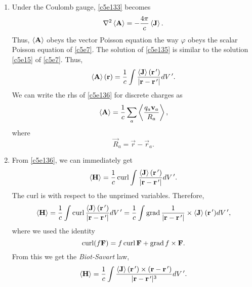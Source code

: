 \begin{enumerate}
\item Under the Coulomb gauge, \eqref{c5e133} becomes
\begin{equation}\label{c5e135}
\nabla^2\left\langle{\mathbf{A}}\right\rangle = -\frac{4\pi}{c}\left\langle{\mathbf{J}}\right\rangle.
\end{equation}
Thus, $\left\langle{\mathbf{A}}\right\rangle$ obeys the vector Poisson equation the way $\varphi$ obeys the
scalar Poisson equation of \eqref{c5e7}. The solution of \eqref{c5e135} is similar
to the solution \eqref{c5e15} of \eqref{c5e7}. Thus,
\begin{equation}\label{c5e136}
\left\langle{\mathbf{A}}\right\rangle(\mathbf{r}) = \frac{1}{c}\int\frac{\left\langle{\mathbf{J}}\right\rangle(\mathbf{r}^{\,\prime})}{|\mathbf{r} - \mathbf{r}^{\,\prime}|}dV^{\,\prime}.
\end{equation}
We can write the rhs of \eqref{c5e136} for discrete charges as
\begin{equation}\label{c5e137}
\left\langle{\mathbf{A}}\right\rangle = \frac{1}{c}\sum_a \left\langle{\frac{q_a\mathbf{v}_a}{R_a}}\right\rangle,
\end{equation}
where 
\begin{equation}\label{c5e138}
\vec{R}_a = \vec{r} - \vec{r}_a.
\end{equation}

\item From \eqref{c5e136}, we can immediately get
\[
\left\langle{\mathbf{H}}\right\rangle = \frac{1}{c}\operatorname{curl}\int\frac{\left\langle{\mathbf{J}}\right\rangle(\mathbf{r}^{\,\prime})}{|\mathbf{r} - \mathbf{r}^{\,\prime}|}dV^{\,\prime}.
\]
The curl is with respect to the unprimed variables. Therefore,
\[
\left\langle{\mathbf{H}}\right\rangle = \frac{1}{c}\int\operatorname{curl}\frac{\left\langle{\mathbf{J}}\right\rangle(\mathbf{r}^{\,\prime})}{|\mathbf{r} - \mathbf{r}^{\,\prime}|}dV^{\,\prime}
 = \frac{1}{c}\int\operatorname{grad}\frac{1}{|\mathbf{r} - \mathbf{r}^{\,\prime}|} \times \left\langle{\mathbf{J}}\right\rangle(\mathbf{r}^{\,\prime})dV^{\,\prime},
\]
where we used the identity
\begin{equation}\label{c5e139}
\operatorname{curl}(f\mathbf{F}) = f\operatorname{curl}\mathbf{F} + \operatorname{grad} f \times \mathbf{F}.
\end{equation}
From this we get the \emph{Biot-Savart} law,
\begin{equation}\label{c5e140}
\left\langle{\mathbf{H}}\right\rangle = \frac{1}{c}\int\frac{\left\langle{\mathbf{J}}\right\rangle(\mathbf{r}^{\,\prime}) \times (\mathbf{r} - \mathbf{r}^{\,\prime})}{|\mathbf{r} - \mathbf{r}^{\,\prime}|^3}dV^{\,\prime}.
\end{equation}


\end{enumerate}
